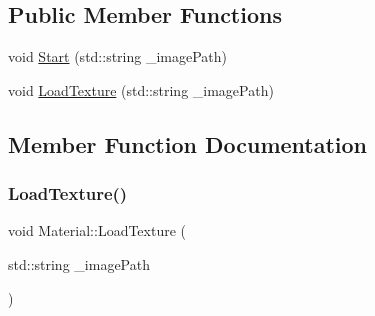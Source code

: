 \subsection*{Public Member Functions}
\begin{DoxyCompactItemize}
\item 
void \mbox{\hyperlink{class_material_a8fcc1a8e83981ddd45c746c7ca98e46c}{Start}} (std\+::string \+\_\+image\+Path)
\item 
void \mbox{\hyperlink{class_material_ae9aac906f4d3d12b8c97908647405111}{Load\+Texture}} (std\+::string \+\_\+image\+Path)
\end{DoxyCompactItemize}


\subsection{Member Function Documentation}
\mbox{\label{class_material_ae9aac906f4d3d12b8c97908647405111}} 
\subsubsection{\texorpdfstring{Load\+Texture()}{LoadTexture()}}
{\footnotesize\ttfamily void Material\+::\+Load\+Texture (\begin{DoxyParamCaption}\item[{std\+::string}]{\+\_\+image\+Path }\end{DoxyParamCaption})}

